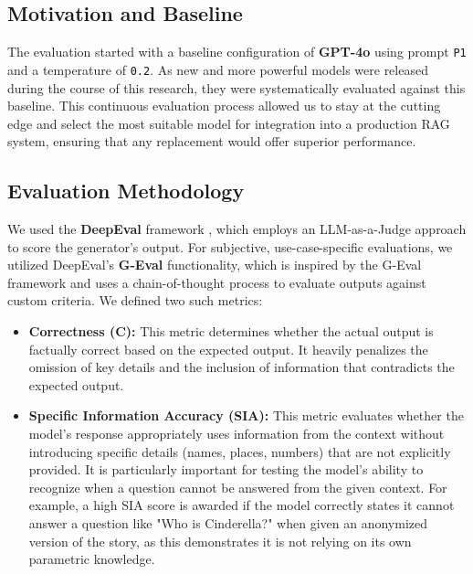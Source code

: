 \subsection{Motivation and Baseline}
The evaluation started with a baseline configuration of \textbf{GPT-4o} using prompt \texttt{P1} and a temperature of \texttt{0.2}. As new and more powerful models were released during the course of this research, they were systematically evaluated against this baseline. This continuous evaluation process allowed us to stay at the cutting edge and select the most suitable model for integration into a production RAG system, ensuring that any replacement would offer superior performance.

\subsection{Evaluation Methodology}
We used the \textbf{DeepEval} framework \autocite{deepeval2023}, which employs an LLM-as-a-Judge approach to score the generator's output. For subjective, use-case-specific evaluations, we utilized DeepEval's \textbf{G-Eval} functionality, which is inspired by the G-Eval framework \autocite{liu2023geval} and uses a chain-of-thought process to evaluate outputs against custom criteria. We defined two such metrics:
\begin{itemize}
    \item \textbf{Correctness (C):} This metric determines whether the actual output is factually correct based on the expected output. It heavily penalizes the omission of key details and the inclusion of information that contradicts the expected output.
    \item \textbf{Specific Information Accuracy (SIA):} This metric evaluates whether the model's response appropriately uses information from the context without introducing specific details (names, places, numbers) that are not explicitly provided. It is particularly important for testing the model's ability to recognize when a question cannot be answered from the given context. For example, a high SIA score is awarded if the model correctly states it cannot answer a question like "Who is Cinderella?" when given an anonymized version of the story, as this demonstrates it is not relying on its own parametric knowledge.
\end{itemize}

